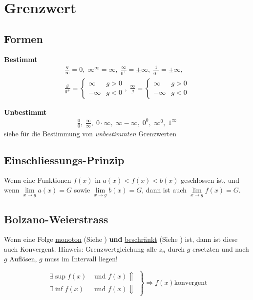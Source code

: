 \section{Grenzwert}
\subsection{Formen}
\noindent\textbf{Bestimmt}
\begin{align*}
	\frac{g}{\infty} = 0,\; 
	\infty^\infty = \infty,\; 
	\frac{\infty}{0^\pm} = \pm\infty,\;
	\frac{1}{0^\pm} = \pm\infty,\;
	\\
	\frac{g}{0^+} = \begin{cases} \infty & g > 0\\-\infty & g < 0 \end{cases},\;
	\frac{\infty}{g} = \begin{cases} \infty & g > 0\\-\infty & g < 0 \end{cases}
\end{align*}

\noindent\textbf{Unbestimmt}
\begin{align*}
	\frac{0}{0},\;
	\frac{\infty}{\infty},\;
	0\cdot\infty,\;
	\infty - \infty,\;
	0^0,\; \infty^0,\;
	1^\infty
\end{align*}
siehe  für die Bestimmung von \textit{unbestimmten} Grenzwerten

\subsection{Einschliessungs-Prinzip }\label{einschliessungsprinzip}
Wenn eine Funktionen $f(x)$ in $a(x) < f(x) < b(x)$ geschlossen ist, und wenn $\lim\limits_{x \rightarrow g}a(x) = G$ sowie $\lim\limits_{x \rightarrow g}b(x) = G$, dann ist auch $\lim\limits_{x \rightarrow g}f(x) = G$.

\subsection{Bolzano-Weierstrass}\label{bolzano}
Wenn eine Folge \underline{monoton} (Siehe ) \textbf{und} \underline{beschränkt} (Siehe ) ist, dann ist diese auch Konvergent. Hinweis: Grenzwertgleichung alle $z_n$ durch $g$ ersetzten und nach $g$ Auflösen, $g$ muss im Intervall liegen!

\[
\left.\begin{aligned}
	\exists\sup f(x) &\text{ und } f(x) \Uparrow \\
	\exists\inf f(x) &\text{ und } f(x) \Downarrow
\end{aligned}
\right\rbrace \Rightarrow 
f(x) \text{konvergent}
\]

